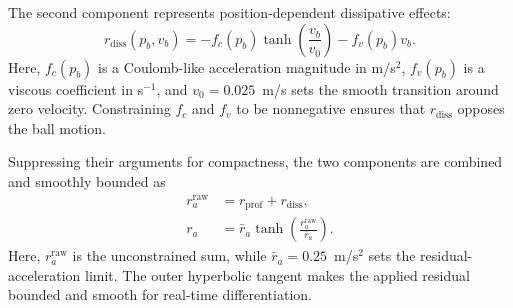 \documentclass[letterpaper, 10 pt, conference]{ieeeconf}  %
\begin{document}
The second component represents position-dependent dissipative effects:
\begin{equation}
    r_{\mathrm{diss}}(p_b,v_b)
    =-f_c(p_b)\tanh\!\left(\frac{v_b}{v_0}\right)-f_v(p_b)v_b.
    \label{eq:dissipative_residual}
\end{equation}
Here, $f_c(p_b)$ is a Coulomb-like acceleration magnitude in m/s$^2$, $f_v(p_b)$ is a viscous coefficient in
s$^{-1}$, and $v_0=0.025$~m/s sets the smooth transition around zero velocity. Constraining $f_c$ and $f_v$ to
be nonnegative ensures that $r_{\mathrm{diss}}$ opposes the ball motion.

Suppressing their arguments for compactness, the two components are combined and smoothly bounded as
\begin{equation}
\begin{aligned}
    r_a^{\mathrm{raw}}&=r_{\mathrm{prof}}+r_{\mathrm{diss}},\\
    r_a&=\bar r_a\tanh\!\left(\frac{r_a^{\mathrm{raw}}}{\bar r_a}\right).
\end{aligned}
    \label{eq:structured_residual_components}
\end{equation}
Here, $r_a^{\mathrm{raw}}$ is the unconstrained sum, while $\bar r_a=0.25$~m/s$^2$ sets the residual-acceleration
limit. The outer hyperbolic tangent makes the applied residual bounded and smooth for real-time differentiation.
\end{document}
